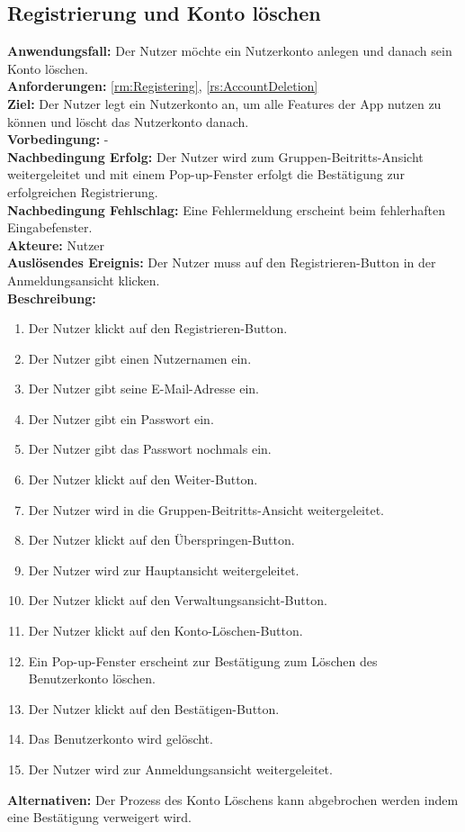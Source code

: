 \documentclass[parskip=full]{scrartcl}
\begin{document}
\subsection{Registrierung und Konto löschen}
\textbf{Anwendungsfall:} Der Nutzer möchte ein Nutzerkonto anlegen und danach sein Konto löschen.\\
\textbf{Anforderungen:} \ref{rm:Registering}, \ref{rs:AccountDeletion} \\
\textbf{Ziel:} Der Nutzer legt ein Nutzerkonto an, um alle Features der App nutzen zu können und löscht das Nutzerkonto danach.\\
\textbf{Vorbedingung:} -\\
\textbf{Nachbedingung Erfolg:} Der Nutzer wird zum Gruppen-Beitritts-Ansicht weitergeleitet und mit einem Pop-up-Fenster erfolgt die Bestätigung zur erfolgreichen Registrierung.\\
\textbf{Nachbedingung Fehlschlag:} Eine Fehlermeldung erscheint beim fehlerhaften Eingabefenster.\\
\textbf{Akteure:} Nutzer\\
\textbf{Auslösendes Ereignis:} Der Nutzer muss auf den Registrieren-Button in der Anmeldungsansicht klicken.\\
\textbf{Beschreibung:}
\begin{enumerate}
    \item Der Nutzer klickt auf den Registrieren-Button.
    \item Der Nutzer gibt einen Nutzernamen ein.
    \item Der Nutzer gibt seine E-Mail-Adresse ein.
    \item Der Nutzer gibt ein Passwort ein.
    \item Der Nutzer gibt das Passwort nochmals ein.
    \item Der Nutzer klickt auf den Weiter-Button.
    \item Der Nutzer wird in die Gruppen-Beitritts-Ansicht weitergeleitet.
    \item Der Nutzer klickt auf den Überspringen-Button.
    \item Der Nutzer wird zur Hauptansicht weitergeleitet.
    \item Der Nutzer klickt auf den Verwaltungsansicht-Button.
    \item Der Nutzer klickt auf den Konto-Löschen-Button.
    \item Ein Pop-up-Fenster erscheint zur Bestätigung zum Löschen des Benutzerkonto löschen.
    \item Der Nutzer klickt auf den Bestätigen-Button.
    \item Das Benutzerkonto wird gelöscht.
    \item Der Nutzer wird zur Anmeldungsansicht weitergeleitet.
\end{enumerate}
\textbf{Alternativen:} Der Prozess des Konto Löschens kann abgebrochen werden indem eine Bestätigung verweigert wird.
\newpage
\end{document}
